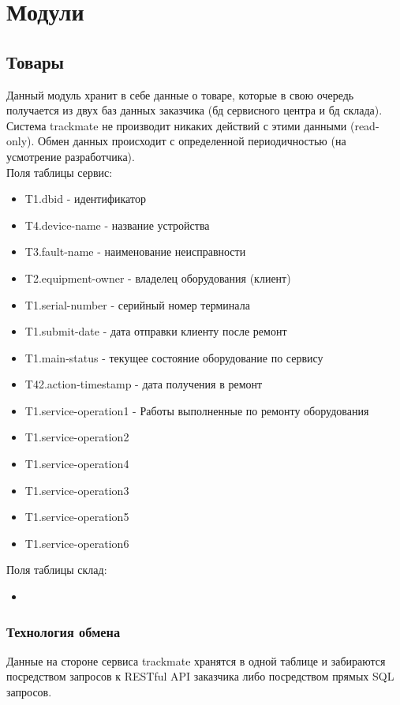 \documentclass[DIV=calc, paper=a4, fontsize=11pt]{scrartcl} %
\begin{document}
\section{Модули}

\subsection{Товары}

Данный модуль хранит в себе данные о товаре, которые в свою очередь получается из двух баз данных заказчика (бд сервисного центра и бд склада). Система trackmate не производит никаких действий с этими данными (read-only). Обмен данных происходит с определенной периодичностью (на усмотрение разработчика).
\\[0.5cm]
Поля таблицы сервис:

\begin{itemize}
	\item T1.dbid - идентификатор
	\item T4.device-name - название устройства
	\item T3.fault-name - наименование неисправности
	\item T2.equipment-owner - владелец оборудования (клиент)
	\item T1.serial-number - серийный номер терминала
	\item T1.submit-date - дата отправки клиенту после ремонт
	\item T1.main-status - текущее состояние оборудование по сервису
	\item T42.action-timestamp - дата получения в ремонт
	\item T1.service-operation1 - Работы выполненные по ремонту оборудования
	\item T1.service-operation2
	\item T1.service-operation4
	\item T1.service-operation3
	\item T1.service-operation5
	\item T1.service-operation6
\end{itemize}

Поля таблицы склад:

\begin{itemize}
	\item 
\end{itemize}

\subsubsection{Технология обмена}
Данные на стороне сервиса trackmate хранятся в одной таблице и забираются посредством запросов к RESTful API заказчика либо посредством прямых SQL запросов. 
\end{document}
